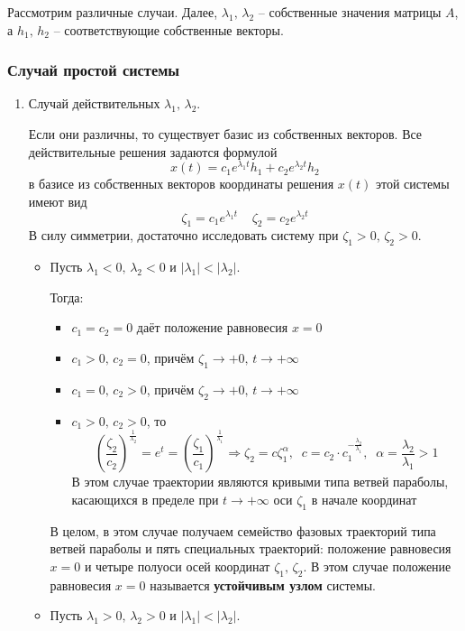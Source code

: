 \documentclass[a4paper,12pt]{article}
\theoremstyle{plain}
\theoremstyle{definition}
\theoremstyle{remark}
\begin{document}
Рассмотрим различные случаи. Далее, $\lambda_1,\,\lambda_2$ -- собственные значения матрицы $A$, а $h_1,\,h_2$ -- соответствующие собственные векторы.
\subsubsection*{Случай простой системы}
\begin{enumerate}
	\item Случай действительных $\lambda_1,\,\lambda_2$.

	      Если они различны, то существует базис из собственных векторов. Все действительные решения задаются формулой
	      \[x(t) = c_1e^{\lambda_1 t}h_1 + c_2e^{\lambda_2 t}h_2\]
	      в базисе из собственных векторов координаты решения $x(t)$ этой системы имеют вид
	      \[\zeta_1 = c_1e^{\lambda_1 t}\;\;\;\; \zeta_2 = c_2e^{\lambda_2 t}\]
	      В силу симметрии, достаточно исследовать систему при $\zeta_1 > 0,\, \zeta_2 > 0$.
	      \begin{itemize}
		      \item Пусть $\lambda_1 < 0,\, \lambda_2 < 0$ и $|\lambda_1| < |\lambda_2|$.

		            Тогда:
		            \begin{itemize}
			            \item $c_1 = c_2 = 0$ даёт положение равновесия $x = 0$
			            \item $c_1 > 0,\, c_2 = 0$, причём $\zeta_1 \to +0,\, t \to +\infty$
			            \item $c_1 = 0,\, c_2 > 0$, причём $\zeta_2 \to +0,\, t \to +\infty$
			            \item $c_1 > 0,\, c_2 > 0$, то
			                  \[\left(\frac{\zeta_2}{c_2}\right)^{\frac{1}{\lambda_2}} = e^t = \left(\frac{\zeta_1}{c_1}\right)^{\frac{1}{\lambda_1}} \Rightarrow \zeta_2 = c\zeta_1^\alpha,\;\; c = c_2 \cdot c_1^{-\frac{\lambda_2}{\lambda_1}},\;\; \alpha = \frac{\lambda_2}{\lambda_1} > 1\]
			                  В этом случае траектории являются кривыми типа ветвей параболы, касающихся в пределе при $t \to +\infty$ оси $\zeta_1$ в начале координат
		            \end{itemize}
		            В целом, в этом случае получаем семейство фазовых траекторий типа ветвей параболы и пять специальных траекторий: положение равновесия $x = 0$ и четыре полуоси осей координат $\zeta_1,\,\zeta_2$. В этом случае положение равновесия $x = 0$ называется \textbf{устойчивым узлом} системы.
		      \item Пусть $\lambda_1 > 0,\, \lambda_2 > 0$ и $|\lambda_1| < |\lambda_2|$.


\end{itemize}
\end{enumerate}
\end{document}
